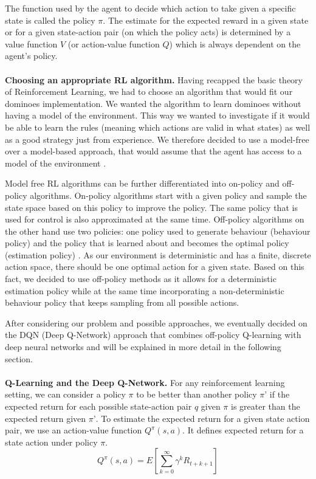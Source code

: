 \documentclass[12pt,a4paper]{article}
\begin{document}
The function used by the agent to decide which action to take given a specific state is called the policy $\pi$. The estimate for the expected reward in a given state or for a given state-action pair (on which the policy acts) is determined by a value function $V$ (or action-value function $Q$) which is always dependent on the agent's policy.
\\ 
\\
\noindent \textbf{Choosing an appropriate RL algorithm.} Having recapped the basic theory of Reinforcement Learning, we had to choose an algorithm that would fit our dominoes implementation. We wanted the algorithm to learn dominoes without having a model of the environment. This way we wanted to investigate if it would be able to learn the rules (meaning which actions are valid in what states) as well as a good strategy just from experience. We therefore decided to use a model-free over a model-based approach, that would assume that the agent has access to a model of the environment \citep{russell_artificial_2010}.

Model free RL algorithms can be further differentiated into on-policy and off-policy algorithms. On-policy algorithms start with a given policy and sample the state space based on this policy to improve the policy. The same policy that is used for control is also approximated at the same time. Off-policy algorithms on the other hand use two policies: one policy used to generate behaviour (behaviour policy) and the policy that is learned about and becomes the optimal policy (estimation policy) \citep{sutton_reinforcement_2018}. As our environment is deterministic and has a finite, discrete action space, there should be one optimal action for a given state. Based on this fact, we decided to use off-policy methods as it allows for a deterministic estimation policy while at the same time incorporating a non-deterministic behaviour policy that keeps sampling from all possible actions.

After considering our problem and possible approaches, we eventually decided on the DQN (Deep Q-Network) approach that combines off-policy Q-learning with deep neural networks and will be explained in more detail in the following section.
\\ 
\\
\noindent \textbf{Q-Learning and the Deep Q-Network.}
For any reinforcement learning setting, we can consider a policy $\pi$ to be better than another policy $\pi’$ if the expected return for each possible state-action pair $q$ given $\pi$ is greater than the expected return given $\pi’$. To estimate the expected return for a given state action pair, we use an action-value function $Q^{\pi}(s,a)$. It defines expected return for a state action under policy $\pi$.
\[ 
 Q^{\pi}(s,a) = E\left[  \sum_{k=0}^{\infty}  \gamma^k R_{t+k+1} \right]
\]
\end{document}

